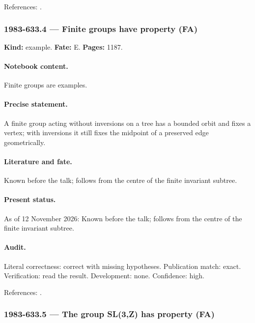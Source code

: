 \noindent References: \citep{serre1977arbres,bekkadelaharpevalette2008kazhdan}.\par

\subsubsection{1983-633.4 --- Finite groups have property (FA)}

\label{item:1983-633.4}

\noindent\textbf{Kind:} example. \textbf{Fate:} E. \textbf{Pages:} 1187.\par

\paragraph{Notebook content.} Finite groups are examples.

\paragraph{Precise statement.} A finite group acting without inversions on a tree has a bounded orbit and fixes a vertex; with inversions it still fixes the midpoint of a preserved edge geometrically.

\paragraph{Literature and fate.} Known before the talk; follows from the centre of the finite invariant subtree.

\paragraph{Present status.} As of 12 November 2026: Known before the talk; follows from the centre of the finite invariant subtree.

\paragraph{Audit.} Literal correctness: correct with missing hypotheses. Publication match: exact. Verification: read the result. Development: none. Confidence: high.

\noindent References: \citep{serre1977arbres,bekkadelaharpevalette2008kazhdan}.\par

\subsubsection{1983-633.5 --- The group SL(3,Z) has property (FA)}


